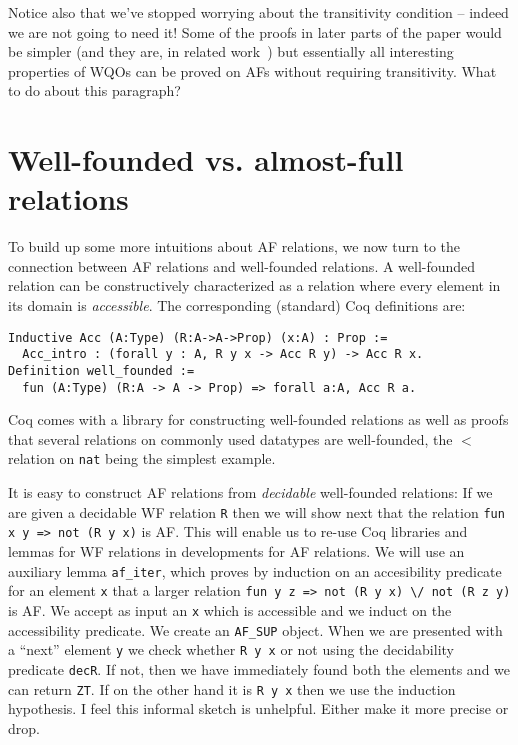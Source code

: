 \documentclass{llncs}
\newcommand{\dv}[1]{{\color{red}{\bf DV:} #1}}
\begin{document}
Notice also that we've stopped worrying about the transitivity condition -- indeed we are not going to need it!
Some of the proofs in later parts of the paper would be simpler 
(and they are, in related work~\cite{OnWellQuasiOrderingFiniteTrees}) but essentially 
all interesting properties of WQOs can be proved on AFs without requiring transitivity. \dv{What to do about this paragraph?}

\section{Well-founded vs. almost-full relations}\label{sect:wf-to-af}

To build up some more intuitions about AF relations, we now turn to the connection between
AF relations and well-founded relations. A well-founded relation can be constructively 
characterized as a relation where every element in its domain is {\em accessible}. 
The corresponding (standard) Coq definitions are: 
\begin{lstlisting}
Inductive Acc (A:Type) (R:A->A->Prop) (x:A) : Prop :=
  Acc_intro : (forall y : A, R y x -> Acc R y) -> Acc R x.
Definition well_founded :=
  fun (A:Type) (R:A -> A -> Prop) => forall a:A, Acc R a.
\end{lstlisting}
Coq comes with a library for constructing well-founded relations
as well as proofs that several relations on commonly used datatypes are well-founded, 
the $<$ relation on \lstinline|nat| being the simplest example. 

It is easy to construct AF relations from {\em decidable} well-founded relations:
If we are given a decidable WF relation \lstinline|R| then we will
show next that the relation \lstinline|fun x y => not (R y x)| is AF. This will enable 
us to re-use Coq libraries and lemmas for WF relations in developments for AF relations.
We will use an auxiliary lemma \lstinline|af_iter|, which proves by 
induction on an accesibility predicate for an element \lstinline|x| 
that a larger relation \lstinline|fun y z => not (R y x) \/ not (R z y)| is 
AF. 
We accept as input an \lstinline|x| which is accessible and we induct on the accessibility predicate. We 
create an \lstinline|AF_SUP| object. When we are presented with a ``next'' 
element \lstinline|y| we check whether \lstinline|R y x| or not using the decidability predicate \lstinline|decR|. If not, then we have immediately found both the elements and we can return \lstinline|ZT|. If on the other hand
it is \lstinline|R y x| then we use the induction hypothesis.
\dv{I feel this informal sketch is unhelpful. 
Either make it more precise or drop.}
\end{document}
